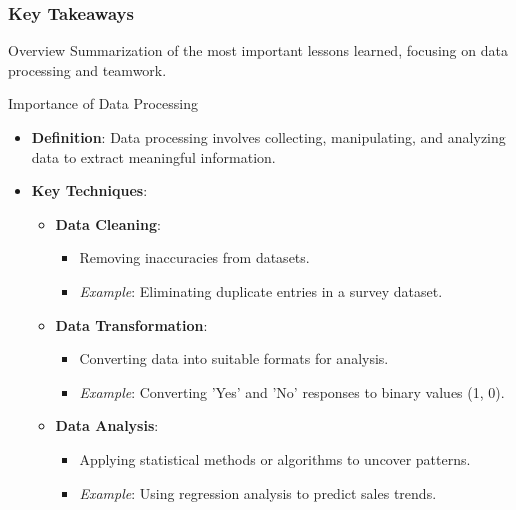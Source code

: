 \documentclass[aspectratio=169]{beamer}
\begin{document}
\begin{frame}
    \frametitle{Key Takeaways}
    \begin{block}{Overview}
        Summarization of the most important lessons learned, focusing on data processing and teamwork.
    \end{block}
\end{frame}

\begin{frame}{Importance of Data Processing}
    \begin{itemize}
        \item \textbf{Definition}: Data processing involves collecting, manipulating, and analyzing data to extract meaningful information.
        \item \textbf{Key Techniques}:
            \begin{itemize}
                \item \textbf{Data Cleaning}:
                    \begin{itemize}
                        \item Removing inaccuracies from datasets.
                        \item \textit{Example}: Eliminating duplicate entries in a survey dataset.
                    \end{itemize}
                \item \textbf{Data Transformation}:
                    \begin{itemize}
                        \item Converting data into suitable formats for analysis.
                        \item \textit{Example}: Converting 'Yes' and 'No' responses to binary values (1, 0).
                    \end{itemize}
                \item \textbf{Data Analysis}:
                    \begin{itemize}
                        \item Applying statistical methods or algorithms to uncover patterns.
                        \item \textit{Example}: Using regression analysis to predict sales trends.
                    \end{itemize}
            \end{itemize}
    \end{itemize}
\end{frame}
\end{document}
